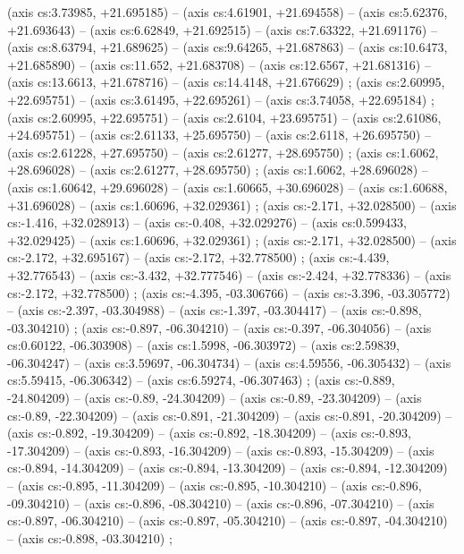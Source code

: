     (axis cs:3.73985,    +21.695185) --  (axis cs:4.61901,    +21.694558) --  (axis cs:5.62376,    +21.693643) --  (axis cs:6.62849,    +21.692515) --  (axis cs:7.63322,    +21.691176) --  (axis cs:8.63794,    +21.689625) --  (axis cs:9.64265,    +21.687863) --  (axis cs:10.6473,    +21.685890) --  (axis cs:11.652,    +21.683708) --  (axis cs:12.6567,    +21.681316) --  (axis cs:13.6613,    +21.678716) --  (axis cs:14.4148,    +21.676629) ;
    (axis cs:2.60995,    +22.695751) --  (axis cs:3.61495,    +22.695261) --  (axis cs:3.74058,    +22.695184) ;
    (axis cs:2.60995,    +22.695751) --  (axis cs:2.6104,    +23.695751) --  (axis cs:2.61086,    +24.695751) --  (axis cs:2.61133,    +25.695750) --  (axis cs:2.6118,    +26.695750) --  (axis cs:2.61228,    +27.695750) --  (axis cs:2.61277,    +28.695750) ;
    (axis cs:1.6062,    +28.696028) --  (axis cs:2.61277,    +28.695750) ;
    (axis cs:1.6062,    +28.696028) --  (axis cs:1.60642,    +29.696028) --  (axis cs:1.60665,    +30.696028) --  (axis cs:1.60688,    +31.696028) --  (axis cs:1.60696,    +32.029361) ;
    (axis cs:-2.171,    +32.028500) --  (axis cs:-1.416,    +32.028913) --  (axis cs:-0.408,    +32.029276) --  (axis cs:0.599433,    +32.029425) --  (axis cs:1.60696,    +32.029361) ;
    (axis cs:-2.171,    +32.028500) --  (axis cs:-2.172,    +32.695167) --  (axis cs:-2.172,    +32.778500) ;
    (axis cs:-4.439,    +32.776543) --  (axis cs:-3.432,    +32.777546) --  (axis cs:-2.424,    +32.778336) --  (axis cs:-2.172,    +32.778500) ;
    (axis cs:-4.395,    -03.306766) --  (axis cs:-3.396,    -03.305772) --  (axis cs:-2.397,    -03.304988) --  (axis cs:-1.397,    -03.304417) --  (axis cs:-0.898,    -03.304210) ;
    (axis cs:-0.897,    -06.304210) --  (axis cs:-0.397,    -06.304056) --  (axis cs:0.60122,    -06.303908) --  (axis cs:1.5998,    -06.303972) --  (axis cs:2.59839,    -06.304247) --  (axis cs:3.59697,    -06.304734) --  (axis cs:4.59556,    -06.305432) --  (axis cs:5.59415,    -06.306342) --  (axis cs:6.59274,    -06.307463) ;
    (axis cs:-0.889,    -24.804209) --  (axis cs:-0.89,    -24.304209) --  (axis cs:-0.89,    -23.304209) --  (axis cs:-0.89,    -22.304209) --  (axis cs:-0.891,    -21.304209) --  (axis cs:-0.891,    -20.304209) --  (axis cs:-0.892,    -19.304209) --  (axis cs:-0.892,    -18.304209) --  (axis cs:-0.893,    -17.304209) --  (axis cs:-0.893,    -16.304209) --  (axis cs:-0.893,    -15.304209) --  (axis cs:-0.894,    -14.304209) --  (axis cs:-0.894,    -13.304209) --  (axis cs:-0.894,    -12.304209) --  (axis cs:-0.895,    -11.304209) --  (axis cs:-0.895,    -10.304210) --  (axis cs:-0.896,    -09.304210) --  (axis cs:-0.896,    -08.304210) --  (axis cs:-0.896,    -07.304210) --  (axis cs:-0.897,    -06.304210) --  (axis cs:-0.897,    -05.304210) --  (axis cs:-0.897,    -04.304210) --  (axis cs:-0.898,    -03.304210) ;
